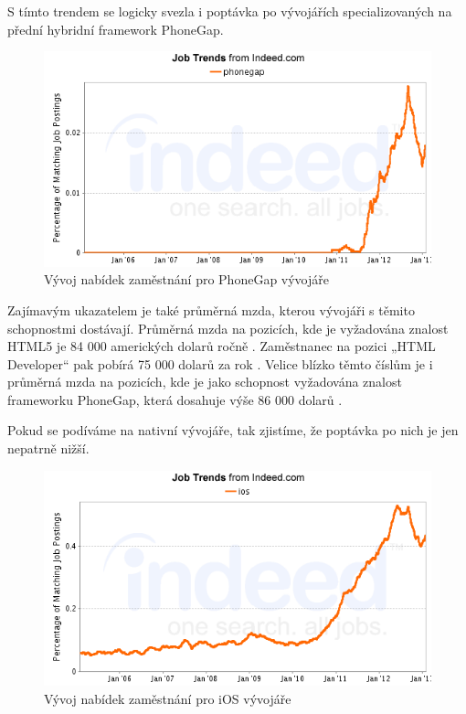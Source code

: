 S tímto trendem se logicky svezla i poptávka po vývojářích specializovaných na přední hybridní framework PhoneGap.

\begin{figure}\centering
\includegraphics[width=1.0\textwidth]{jobgraph_phonegap.png}
\caption{Vývoj nabídek zaměstnání pro PhoneGap vývojáře \cite{job_indeed}}
\label{fig:PhoneGapJobs}
\end{figure}

Zajímavým ukazatelem je také průměrná mzda, kterou vývojáři s těmito schopnostmi dostávají. Průměrná mzda na pozicích, kde je vyžadována znalost HTML5 je 84 000 amerických dolarů ročně \cite{job_indeed}. Zaměstnanec na pozici „HTML Developer“ pak pobírá 75 000 dolarů za rok \cite{job_indeed}. Velice blízko těmto číslům je i průměrná mzda na pozicích, kde je jako schopnost vyžadována znalost frameworku PhoneGap, která dosahuje výše 86 000 dolarů \cite{job_indeed}.

Pokud se podíváme na nativní vývojáře, tak zjistíme, že poptávka po nich je jen nepatrně nižší.

\begin{figure}\centering
\includegraphics[width=1.0\textwidth]{jobgraph_ios.png}
\caption{Vývoj nabídek zaměstnání pro iOS vývojáře \cite{job_indeed}}
\label{fig:iOSJobs}
\end{figure}

